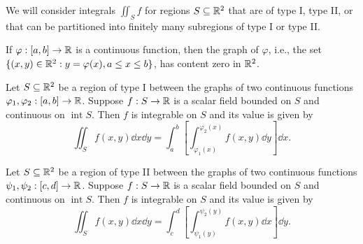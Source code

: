 \begin{remarkenv}
    We will consider integrals $\displaystyle \iint_S f$ for regions $S\subseteq \mathbb{R}^2$ that are of type I, type II, or that can be partitioned into finitely many subregions of type I or type II.
\end{remarkenv}
\begin{theoremenv}
    If $\varphi: [a,b] \to \mathbb{R}$ is a continuous function, then the graph of $\varphi$, i.e., the set $\{(x,y) \in \mathbb{R}^2 : y = \varphi(x), a \leq x \leq b\}$, has content zero in $\mathbb{R}^2$.
\end{theoremenv}
\begin{theoremenv}
    Let $S\subseteq \mathbb{R}^2$ be a region of type I between the graphs of two continuous functions $\varphi_1, \varphi_2: [a,b] \to \mathbb{R}$. Suppose $f:S\to \mathbb{R}$ is a scalar field bounded on $S$ and continuous on $\operatorname{int} S$. Then $f$ is integrable on $S$ and its value is given by
    $$ \iint_S f(x,y) \dd x \dd y = \int_a^b \left[ \int_{\varphi_1(x)}^{\varphi_2(x)} f(x,y) \dd y \right] \dd x. $$
\end{theoremenv}
\begin{corollaryenv}
    Let $S\subseteq \mathbb{R}^2$ be a region of type II between the graphs of two continuous functions $\psi_1, \psi_2: [c,d] \to \mathbb{R}$. Suppose $f:S\to \mathbb{R}$ is a scalar field bounded on $S$ and continuous on $\operatorname{int} S$. Then $f$ is integrable on $S$ and its value is given by
    $$ \iint_S f(x,y) \dd x \dd y = \int_c^d \left[ \int_{\psi_1(y)}^{\psi_2(y)} f(x,y) \dd x \right] \dd y. $$
\end{corollaryenv}
